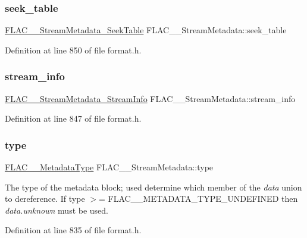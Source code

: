 \subsubsection{\texorpdfstring{seek\_table}{seek\_table}}
{\footnotesize\ttfamily \mbox{\hyperlink{struct_f_l_a_c_____stream_metadata___seek_table}{F\+L\+A\+C\+\_\+\+\_\+\+Stream\+Metadata\+\_\+\+Seek\+Table}} F\+L\+A\+C\+\_\+\+\_\+\+Stream\+Metadata\+::seek\+\_\+table}



Definition at line 850 of file format.\+h.

\mbox{\label{struct_f_l_a_c_____stream_metadata_a827c8671721b01ed3007adbe81ae0c6b}} 
\subsubsection{\texorpdfstring{stream\_info}{stream\_info}}
{\footnotesize\ttfamily \mbox{\hyperlink{struct_f_l_a_c_____stream_metadata___stream_info}{F\+L\+A\+C\+\_\+\+\_\+\+Stream\+Metadata\+\_\+\+Stream\+Info}} F\+L\+A\+C\+\_\+\+\_\+\+Stream\+Metadata\+::stream\+\_\+info}



Definition at line 847 of file format.\+h.

\mbox{\label{struct_f_l_a_c_____stream_metadata_a39fd0655464f2cc7c9c37ae715088aec}} 
\subsubsection{\texorpdfstring{type}{type}}
{\footnotesize\ttfamily \mbox{\hyperlink{group__flac__format_gac71714ba8ddbbd66d26bb78a427fac01}{F\+L\+A\+C\+\_\+\+\_\+\+Metadata\+Type}} F\+L\+A\+C\+\_\+\+\_\+\+Stream\+Metadata\+::type}

The type of the metadata block; used determine which member of the {\itshape data} union to dereference. If type $>$= F\+L\+A\+C\+\_\+\+\_\+\+M\+E\+T\+A\+D\+A\+T\+A\+\_\+\+T\+Y\+P\+E\+\_\+\+U\+N\+D\+E\+F\+I\+N\+ED then {\itshape data.\+unknown} must be used. 

Definition at line 835 of file format.\+h.


